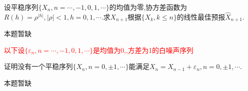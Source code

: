 \begin{problem}{4.32}
设平稳序列$\{X_n, n=\cdots ,-1,0,1,\cdots \}$的均值为零,协方差函数为$R(h)=\rho ^{|h|},|\rho|<1,h=0,1,\cdots $.求$X_{n+1}$根据$\{X_k, k\leqslant n\}$的线性最佳预报$\hat{X}_{n+1}$.
\end{problem}
\begin{solution}
	本题暂缺\\
\end{solution}

\noindent\textcolor{red}{以下设$\{\varepsilon_n, n=\cdots ,-1,0,1,\cdots \}$是均值为0,,方差为1的白噪声序列}

\begin{problem}{4.33}
证明没有一个平稳序列$\{X_n, n=0,\pm 1,\cdots \}$能满足$X_n=X_{n-1}+\varepsilon_n, n=0,\pm 1,\cdots$.
\end{problem}
\begin{solution}
	本题暂缺
\end{solution}

